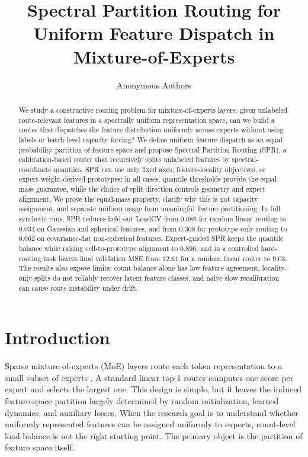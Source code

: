 \documentclass{article}
\title{Spectral Partition Routing for Uniform Feature Dispatch in Mixture-of-Experts}
\author{Anonymous Authors}
\begin{document}
\maketitle

\begin{abstract}
We study a constructive routing problem for mixture-of-experts layers: given
unlabeled route-relevant features in a spectrally uniform representation space,
can we build a router that dispatches the feature distribution uniformly across
experts without using labels or batch-level capacity forcing?  We define
uniform feature dispatch as an equal-probability partition of feature space and
propose Spectral Partition Routing (SPR), a calibration-based router that
recursively splits unlabeled features by spectral-coordinate quantiles.  SPR can
use only fixed axes, feature-locality objectives, or expert-weight-derived
prototypes; in all cases, quantile thresholds provide the equal-mass guarantee,
while the choice of split direction controls geometry and expert alignment.  We
prove the equal-mass property, clarify why this is not capacity assignment, and
separate uniform usage from meaningful feature partitioning.  In full synthetic
runs, SPR reduces held-out LoadCV from $0.086$ for random linear routing to
$0.034$ on Gaussian and spherical features, and from $0.308$ for prototype-only
routing to $0.062$ on covariance-flat non-spherical features.  Expert-guided SPR
keeps the quantile balance while raising cell-to-prototype alignment to $0.896$,
and in a controlled hard-routing task lowers final validation MSE from $12.61$
for a random linear router to $9.03$.  The results also expose limits: count
balance alone has low feature agreement, locality-only splits do not reliably
recover latent feature classes, and naive slow recalibration can cause route
instability under drift.
\end{abstract}

\section{Introduction}

Sparse mixture-of-experts (MoE) layers route each token representation to a
small subset of experts \citep{shazeer2017outrageously,fedus2022switch}.  A
standard linear top-1 router computes one score per expert and selects the
largest one.  This design is simple, but it leaves the induced feature-space
partition largely determined by random initialization, learned dynamics, and
auxiliary losses.  When the research goal is to understand whether uniformly
represented features can be assigned uniformly to experts, count-level load
balance is not the right starting point.  The primary object is the partition of
feature space itself.
\end{document}
